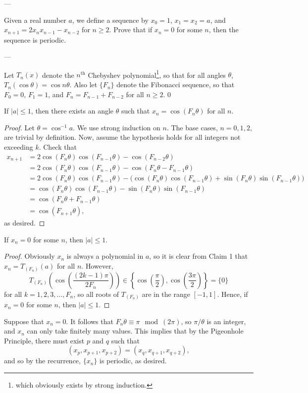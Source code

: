 
---

Given a real number $a$, we define a sequence by $x_0=1$, $x_1=x_2=a$, and $x_{n+1}=2x_nx_{n-1}-x_{n-2}$ for $n\ge 2$. Prove that if $x_n=0$ for some $n$, then the sequence is periodic.

---

Let $T_n(x)$ denote the $n^\text{th}$ Chebyshev polynomial\footnote{which obviously exists by strong induction.}, so that for all angles $\theta$, $T_n(\cos\theta)=\cos n\theta$. Also let $\{F_n\}$ denote the Fibonacci sequence, so that $F_0=0$, $F_1=1$, and $F_n=F_{n-1}+F_{n-2}$ for all $n\ge 2$.
\setcounter{iclaim}0
\begin{iclaim}
If $|a|\le 1$, then there exists an angle $\theta$ such that $x_n=\cos(F_n\theta)$ for all $n$.
\end{iclaim}
\begin{proof}
Let $\theta=\cos^{-1} a$. We use strong induction on $n$. The base cases, $n=0,1,2$, are trivial by definition. Now, assume the hypothesis holds for all integers not exceeding $k$. Check that
\begin{align*}
x_{n+1}&=2\cos(F_n\theta)\cos(F_{n-1}\theta)-\cos(F_{n-2}\theta)\\
&=2\cos(F_n\theta)\cos(F_{n-1}\theta)-\cos(F_n\theta-F_{n-1}\theta)\\
&=2\cos(F_n\theta)\cos(F_{n-1}\theta)-\big(\cos(F_n\theta)\cos(F_{n-1}\theta)+\sin(F_n\theta)\sin(F_{n-1}\theta)\big)\\
&=\cos(F_n\theta)\cos(F_{n-1}\theta)-\sin(F_n\theta)\sin(F_{n-1}\theta)\\
&=\cos(F_n\theta+F_{n-1}\theta)\\
&=\cos(F_{n+1}\theta),
\end{align*}
as desired.
\end{proof}
\begin{iclaim}
If $x_n=0$ for some $n$, then $|a|\le 1$.
\end{iclaim}
\begin{proof}
    Obviously $x_n$ is always a polynomial in $a$, so it is clear from Claim 1 that $x_n=T_{(F_n)}(a)$ for all $n$. However, \[T_{(F_n)}\left(\cos\left(\frac{(2k-1)\pi}{2F_n}\right)\right)\in\left\{\cos\left(\frac{\pi}2\right),\cos\left(\frac{3\pi}2\right)\right\}=\{0\}\]
for all $k=1,2,3,\ldots,F_n$, so all roots of $T_{(F_n)}$ are in the range $[-1,1]$. Hence, if $x_n=0$ for some $n$, then $|a|\le 1$.
\end{proof}

Suppose that $x_n=0$. It follows that $F_n\theta\equiv \pi\mod(2\pi)$, so $\pi/\theta$ is an integer, and $x_n$ can only take finitely many values. This implies that by the Pigeonhole Principle, there must exist $p$ and $q$ such that \[(x_p,x_{p+1},x_{p+2})=(x_q,x_{q+1},x_{q+2}),\]
and so by the recurrence, $\{x_n\}$ is periodic, as desired.

